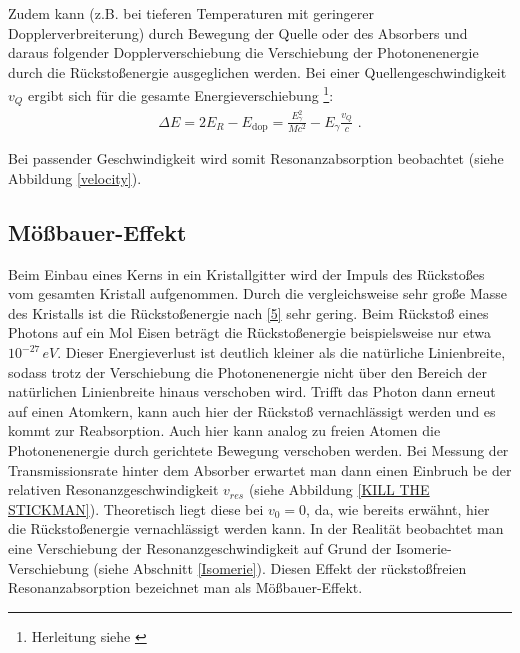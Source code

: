 
Zudem kann (z.B. bei tieferen Temperaturen mit geringerer Dopplerverbreiterung) durch Bewegung der Quelle oder des Absorbers und daraus folgender Dopplerverschiebung die Verschiebung der Photonenenergie durch die Rückstoßenergie ausgeglichen werden.
Bei einer Quellengeschwindigkeit $v_Q$ ergibt sich für die gesamte Energieverschiebung \footnote{Herleitung siehe \cite{jakobs}}:
\begin{align}
\Delta E = 2E_R - E_\text{dop} = \frac{E_{\gamma}^2}{Mc^2} - E_{\gamma}\frac{v_Q}{c}\text{ .}
\end{align}

Bei passender Geschwindigkeit wird somit Resonanzabsorption beobachtet (siehe Abbildung \ref{velocity}). \cite{jakobs}


\subsection{Mößbauer-Effekt}

Beim Einbau eines Kerns in ein Kristallgitter wird der Impuls des Rückstoßes vom gesamten Kristall aufgenommen. Durch die vergleichsweise sehr große Masse des Kristalls ist die Rückstoßenergie nach \ref{5} sehr gering. Beim Rückstoß eines Photons auf ein Mol Eisen beträgt die Rückstoßenergie beispielsweise nur etwa $10^{-27}\,\si{eV}$. Dieser Energieverlust ist deutlich kleiner als die natürliche Linienbreite, sodass trotz der Verschiebung die Photonenenergie nicht über den Bereich der natürlichen Linienbreite hinaus verschoben wird. Trifft das Photon dann erneut auf einen Atomkern, kann auch hier der Rückstoß vernachlässigt werden und es kommt zur Reabsorption. 
Auch hier kann analog zu freien Atomen die Photonenenergie durch gerichtete Bewegung verschoben werden. Bei Messung der Transmissionsrate hinter dem Absorber erwartet man dann einen Einbruch be der relativen Resonanzgeschwindigkeit $v_{res}$ (siehe Abbildung \ref{KILL THE STICKMAN}). Theoretisch liegt diese bei $v_0=0$, da, wie bereits erwähnt, hier die Rückstoßenergie vernachlässigt werden kann. In der Realität beobachtet man eine Verschiebung der Resonanzgeschwindigkeit auf Grund der Isomerie-Verschiebung (siehe Abschnitt \ref{Isomerie}). Diesen Effekt der rückstoßfreien Resonanzabsorption bezeichnet man als Mößbauer-Effekt. \cite{jakobs}

